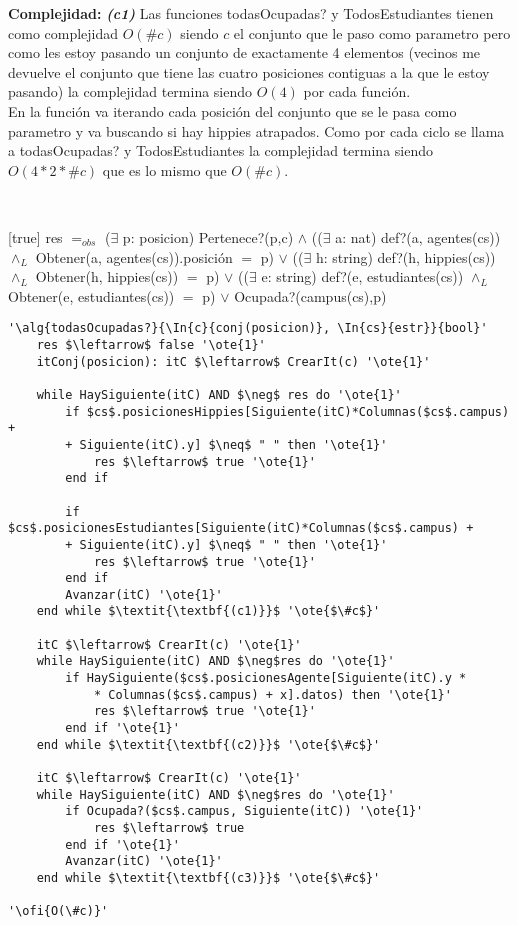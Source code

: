 \textbf{Complejidad:} \textit{\textbf{(c1)}} Las funciones todasOcupadas? y TodosEstudiantes tienen como complejidad $O(\#c)$ siendo $c$ el conjunto que le paso como parametro pero como les estoy pasando un conjunto de exactamente 4 elementos (vecinos me devuelve el conjunto que tiene las cuatro posiciones contiguas a la que le estoy pasando) la complejidad termina siendo $O(4)$ por cada función. \\
En la función va iterando cada posición del conjunto que se le pasa como parametro y va buscando si hay hippies atrapados. Como por cada ciclo se llama a todasOcupadas? y TodosEstudiantes la complejidad termina siendo $O(4 * 2 * \#c)$ que es lo mismo que $O(\#c)$.

~


[true]
{res $=_{obs}$ ($\exists$ p: posicion) Pertenece?(p,c) $\land$ (($\exists$ a: nat) def?(a, agentes(cs)) $\land_L$ Obtener(a, agentes(cs)).posición $=$ p) $\lor$ (($\exists$ h: string) def?(h, hippies(cs)) $\land_L$ Obtener(h, hippies(cs)) $=$ p) $\lor$ (($\exists$ e: string) def?(e, estudiantes(cs)) $\land_L$ Obtener(e, estudiantes(cs)) $=$ p) $\lor$ Ocupada?(campus(cs),p)}

\begin{lstlisting}[mathescape]
'\alg{todasOcupadas?}{\In{c}{conj(posicion)}, \In{cs}{estr}}{bool}'
	res $\leftarrow$ false '\ote{1}'
	itConj(posicion): itC $\leftarrow$ CrearIt(c) '\ote{1}'

	while HaySiguiente(itC) AND $\neg$ res do '\ote{1}'
		if $cs$.posicionesHippies[Siguiente(itC)*Columnas($cs$.campus) +
		+ Siguiente(itC).y] $\neq$ " " then '\ote{1}'
			res $\leftarrow$ true '\ote{1}'
		end if

		if $cs$.posicionesEstudiantes[Siguiente(itC)*Columnas($cs$.campus) +
		+ Siguiente(itC).y] $\neq$ " " then '\ote{1}'
			res $\leftarrow$ true '\ote{1}'
		end if
		Avanzar(itC) '\ote{1}'
	end while $\textit{\textbf{(c1)}}$ '\ote{$\#c$}'

	itC $\leftarrow$ CrearIt(c) '\ote{1}'
	while HaySiguiente(itC) AND $\neg$res do '\ote{1}'
		if HaySiguiente($cs$.posicionesAgente[Siguiente(itC).y *
			* Columnas($cs$.campus) + x].datos) then '\ote{1}'
			res $\leftarrow$ true '\ote{1}'
		end if '\ote{1}'
	end while $\textit{\textbf{(c2)}}$ '\ote{$\#c$}'

	itC $\leftarrow$ CrearIt(c) '\ote{1}'
	while HaySiguiente(itC) AND $\neg$res do '\ote{1}'
		if Ocupada?($cs$.campus, Siguiente(itC)) '\ote{1}'
			res $\leftarrow$ true
		end if '\ote{1}'
		Avanzar(itC) '\ote{1}'
	end while $\textit{\textbf{(c3)}}$ '\ote{$\#c$}'

'\ofi{O(\#c)}'
\end{lstlisting}

